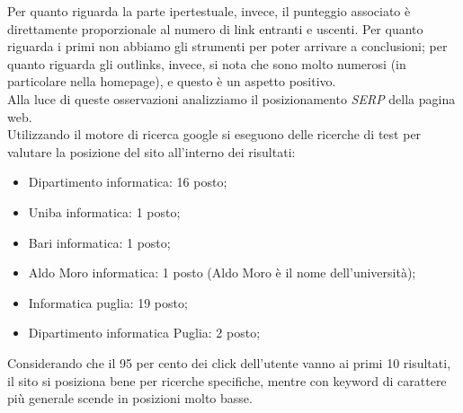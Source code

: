 Per quanto riguarda la parte ipertestuale, invece, il punteggio associato è direttamente proporzionale al numero di link entranti e uscenti. Per quanto riguarda i primi non abbiamo gli strumenti per poter arrivare a conclusioni; per quanto riguarda gli outlinks, invece, si nota che sono molto numerosi (in particolare nella homepage), e questo è un aspetto positivo.\\

Alla luce di queste osservazioni analizziamo il posizionamento \textit{SERP} della pagina web.\\
Utilizzando il motore di ricerca google si eseguono delle ricerche di test per valutare la posizione del sito all'interno dei risultati:
	\begin{itemize}
		\item Dipartimento informatica: 16 posto;
		\item Uniba informatica: 1 posto;
		\item Bari informatica: 1 posto;
		\item Aldo Moro informatica: 1 posto (Aldo Moro è il nome dell'università);
		\item Informatica puglia: 19 posto;
		\item Dipartimento informatica Puglia: 2 posto;
	\end{itemize}
Considerando che il 95 per cento dei click dell'utente vanno ai primi 10 risultati, il sito si posiziona bene per ricerche specifiche, mentre con keyword di carattere più generale scende in posizioni molto basse.



		